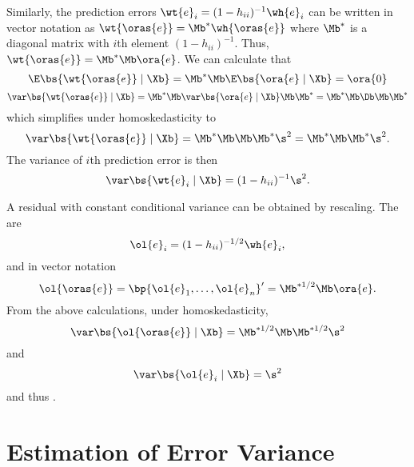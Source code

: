 Similarly, the prediction errors $\wt{e}_i = (1-h_{ii})^{-1} \wh{e}_i$ can be written in vector notation as $\wt{\oras{e}} = \Mb^* \wh{\oras{e}}$ where $\Mb^*$ is a diagonal matrix with $i$th element $(1-h_{ii})^{-1}$. Thus, $\wt{\oras{e}} = \Mb^* \Mb \ora{e}$. We can calculate that 
\begin{equation}
    \notag
    \E\bs{\wt{\oras{e}} \mid \Xb} = \Mb^* \Mb  \E\bs{\ora{e} \mid \Xb} = \ora{0}
\end{equation}
\begin{equation}
    \notag
    \var\bs{\wt{\oras{e}} \mid \Xb} = \Mb^* \Mb  \var\bs{\ora{e} \mid \Xb} \Mb \Mb^*= \Mb^* \Mb  \Db \Mb \Mb^*
\end{equation}
which simplifies under homoskedasticity to 
\begin{equation}
    \notag
    \var\bs{\wt{\oras{e}} \mid \Xb} = \Mb^* \Mb  \Mb \Mb^* \s^2= \Mb^* \Mb   \Mb^* \s^2 .
\end{equation}
The variance of $i$th prediction error is then 
\begin{equation}
    \notag
    \var\bs{\wt{e}_i \mid \Xb} = (1-h_{ii})^{-1} \s^2 .
\end{equation}

A residual with constant conditional variance can be obtained by rescaling. The  are
\begin{equation}
    \label{hansen_eq_4_23}
    \ol{e}_i = (1-h_{ii})^{-1/2} \wh{e}_i,
\end{equation}
and in vector notation
\begin{equation}
    \label{hansen_eq_4_24}
    \ol{\oras{e}} = \bp{\ol{e}_1, \ldots, \ol{e}_n}^\prime = \Mb^{*1/2} \Mb \ora{e}.
\end{equation}
From the above calculations, under homoskedasticity, 
\begin{equation}
    \notag
    \var\bs{\ol{\oras{e}} \mid \Xb} = \Mb^{*1/2} \Mb \Mb^{*1/2} \s^2
\end{equation}
and 
\begin{equation}
    \notag
    \var\bs{\ol{e}_i \mid \Xb} = \s^2
\end{equation}
and thus .

\section{Estimation of Error Variance} \label{hansen_sec_4_13}

